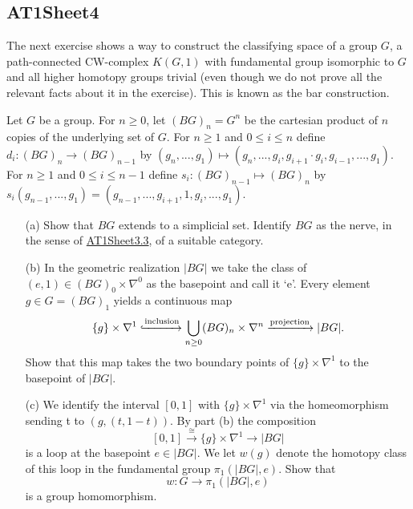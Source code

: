 \begin{sketch}
\end{sketch}

\subsection{AT1Sheet4}

The next exercise shows a way to construct the classifying space of a group $G$, a path-connected CW-complex $K(G,1)$ with fundamental group isomorphic to $G$ and all higher homotopy groups trivial (even though we do not prove all the relevant facts about it in the exercise). This is known as the bar construction.

\label{exercise:AT1Sheet4.1}
Let $G$ be a group. For $n\ge0$, let $(BG)_n = G^n$ be the cartesian product of $n$ copies of the underlying set of $G$. For $n\ge1$ and $0\le i\le n$ define $d_i : (BG)_n \to (BG)_{n-1}$ by
$(g_n,...,g_1) \mapsto (g_n,...,g_i,g_{i+1}\cdot g_i,g_{i-1},...,g_1)$. For $n\ge1$ and $0\le i\le n -1$ define
$s_i : (BG)_{n-1}\mapsto(BG)_n$ by
$s_i(g_{n-1},...,g_1) = (g_{n-1},...,g_{i+1},1,g_i,...,g_1)$.
\begin{enumerate}
    \item[(a)] Show that $BG$ extends to a simplicial set. Identify $BG$ as the nerve, in the sense of \hyperref[exercise:AT1Sheet3.3]{AT1Sheet3.3}, of a suitable category.
    \item[(b)] In the geometric realization $|BG|$ we take the class of $(e,1)\in(BG)_0 \times\nabla^0$ as the basepoint and call it `e'. Every element $g\in G = (BG)_1$ yields a continuous map
    \[\{g\}\times\nabla^1 \xhookrightarrow{\text{inclusion}} \bigcup_{n\ge0} (BG)_n \times\nabla^n \xrightarrow{\text{projection}} |BG|.\]
    Show that this map takes the two boundary points of $\{g\}\times\nabla^1$ to the basepoint of $|BG|$.
    \item[(c)] We identify the interval $[0,1]$ with $\{g\}\times\nabla^1$ via the homeomorphism sending t to $(g,(t,1 -t))$. By part (b) the composition
    \[[0,1]\xrightarrow{\cong}\{g\}\times\nabla^1 \to |BG|\]
    is a loop at the basepoint $e\in |BG|$. We let $w(g)$ denote the homotopy class of this loop in the fundamental group $\pi_1(|BG|,e)$. Show that
    \[w:G\to\pi_1(|BG|,e)\]
    is a group homomorphism.
\end{enumerate}

\begin{sketch}
\end{sketch}

